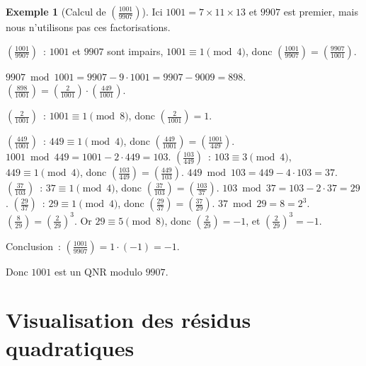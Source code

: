 \documentclass[12pt,a4paper,openany]{book}
\theoremstyle{definition}
\newtheorem{exemple}[definition]{Exemple}
\theoremstyle{plain}
\theoremstyle{remark}
\newcommand{\jacobi}[2]{\left(\frac{#1}{#2}\right)}
\begin{document}
\begin{exemple}[Calcul de $\jacobi{1001}{9907}$]
\label{ex:jacobi-algorithme}
Ici $1001 = 7 \times 11 \times 13$ et $9907$ est premier, mais nous n'utilisons
pas ces factorisations.

$\jacobi{1001}{9907}$~: $1001$ et $9907$ sont impairs, $1001 \equiv 1 \pmod{4}$, donc
$\jacobi{1001}{9907} = \jacobi{9907}{1001}$.

$9907 \bmod 1001 = 9907 - 9 \cdot 1001 = 9907 - 9009 = 898$.
$\jacobi{898}{1001} = \jacobi{2}{1001} \cdot \jacobi{449}{1001}$.

$\jacobi{2}{1001}$~: $1001 \equiv 1 \pmod{8}$, donc $\jacobi{2}{1001} = 1$.

$\jacobi{449}{1001}$~: $449 \equiv 1 \pmod{4}$, donc $\jacobi{449}{1001} = \jacobi{1001}{449}$.
$1001 \bmod 449 = 1001 - 2 \cdot 449 = 103$.
$\jacobi{103}{449}$~: $103 \equiv 3 \pmod{4}$, $449 \equiv 1 \pmod{4}$, donc
$\jacobi{103}{449} = \jacobi{449}{103}$.
$449 \bmod 103 = 449 - 4 \cdot 103 = 37$.
$\jacobi{37}{103}$~: $37 \equiv 1 \pmod{4}$, donc $\jacobi{37}{103} = \jacobi{103}{37}$.
$103 \bmod 37 = 103 - 2 \cdot 37 = 29$.
$\jacobi{29}{37}$~: $29 \equiv 1 \pmod{4}$, donc $\jacobi{29}{37} = \jacobi{37}{29}$.
$37 \bmod 29 = 8 = 2^3$.
$\jacobi{8}{29} = \jacobi{2}{29}^3$. Or $29 \equiv 5 \pmod{8}$, donc
$\jacobi{2}{29} = -1$, et $\jacobi{2}{29}^3 = -1$.

Conclusion~: $\jacobi{1001}{9907} = 1 \cdot (-1) = -1$.

Donc $1001$ est un QNR modulo $9907$.
\end{exemple}

\section{Visualisation des résidus quadratiques}
\label{sec:qr:visualisation}
\end{document}
